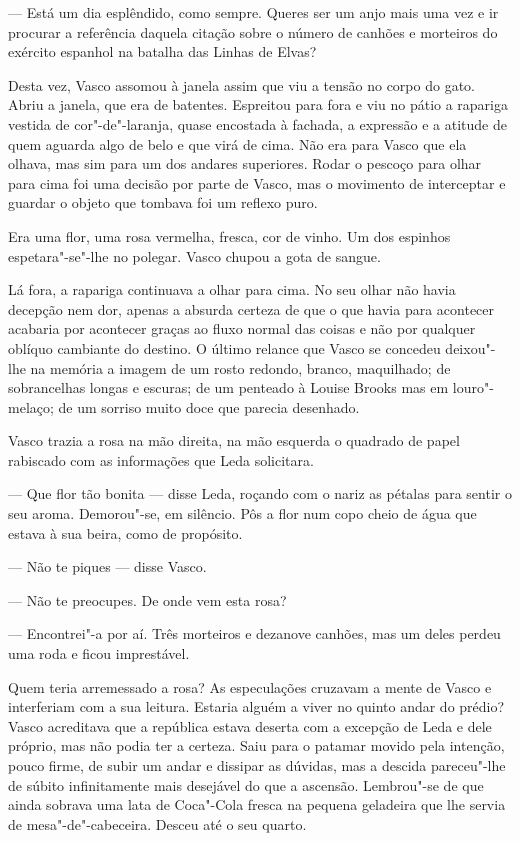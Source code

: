--- Está um dia esplêndido, como sempre. Queres ser um anjo mais uma vez
e ir procurar a referência daquela citação sobre o número de canhões e
morteiros do exército espanhol na batalha das Linhas de Elvas?

Desta vez, Vasco assomou à janela assim que viu a tensão no corpo do
gato. Abriu a janela, que era de batentes. Espreitou para fora e viu
no pátio a rapariga vestida de cor"-de"-laranja, quase encostada à fachada, a expressão e a atitude de quem
aguarda algo de belo e que virá de cima. Não era para Vasco que ela
olhava, mas sim para um dos andares superiores. Rodar o pescoço para
olhar para cima foi uma decisão por parte de Vasco, mas o movimento de
interceptar e guardar o objeto que tombava foi um reflexo puro.

Era uma flor, uma rosa vermelha, fresca, cor de vinho. Um dos espinhos
espetara"-se"-lhe no polegar. Vasco chupou a gota de sangue.

Lá fora, a rapariga continuava a olhar para cima. No seu olhar não havia
decepção nem dor, apenas a absurda certeza de que o que havia para
acontecer acabaria por acontecer graças ao fluxo normal das coisas e não
por qualquer oblíquo cambiante do destino. O último relance que Vasco se
concedeu deixou"-lhe na memória a imagem de um rosto redondo, branco,
maquilhado; de sobrancelhas longas e escuras; de um penteado à Louise
Brooks mas em louro"-melaço; de um sorriso muito doce que parecia
desenhado.

Vasco trazia a rosa na mão direita, na mão esquerda o quadrado de papel
rabiscado com as informações que Leda solicitara.

--- Que flor tão bonita --- disse Leda, roçando com o nariz
as pétalas para sentir o seu aroma. Demorou"-se, em silêncio. Pôs a flor
num copo cheio de água que estava à sua beira, como de propósito.

--- Não te piques --- disse Vasco.

--- Não te preocupes. De onde vem esta rosa?

--- Encontrei"-a por aí. Três morteiros e dezanove canhões, mas um deles
  perdeu uma roda e ficou imprestável.

Quem teria arremessado a rosa? As especulações cruzavam a mente de
Vasco e interferiam com a sua leitura. Estaria alguém a viver no quinto
andar do prédio? Vasco acreditava que a república estava deserta com a
excepção de Leda e dele próprio, mas não podia ter a certeza. Saiu para
o patamar movido pela intenção, pouco firme, de subir um andar e
dissipar as dúvidas, mas a descida pareceu"-lhe de súbito infinitamente
mais desejável do que a ascensão. Lembrou"-se de que ainda sobrava uma
lata de Coca"-Cola fresca na pequena geladeira que lhe servia de
mesa"-de"-cabeceira. Desceu até o seu quarto.


